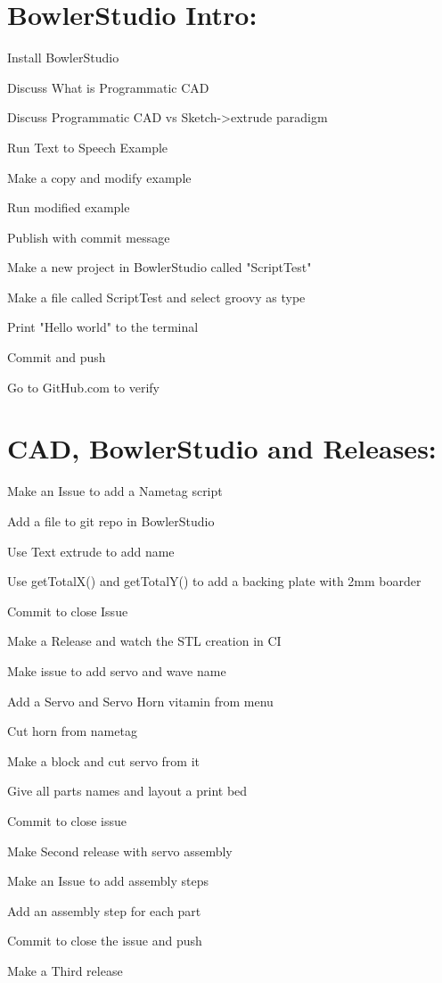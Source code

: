 \documentclass{article}
\begin{document}
\section{BowlerStudio Intro:}
\begin{todolist}
	\item Install BowlerStudio
	\item Discuss What is Programmatic CAD
	\item Discuss Programmatic CAD vs Sketch->extrude paradigm
	\item Run Text to Speech Example
	\item Make a copy and modify example
	\item Run modified example
	\item Publish with commit message
	\item Make a new project in BowlerStudio called "ScriptTest"
	\item Make a file called ScriptTest and select groovy as type
	\item Print "Hello world" to the terminal
	\item Commit and push
	\item Go to GitHub.com to verify
\end{todolist}

\newpage

\section{CAD, BowlerStudio and Releases:}
\begin{todolist}
	\item Make an Issue to add a Nametag script
	\item Add a file to git repo in BowlerStudio
	\item Use Text extrude to add name
	\item Use getTotalX() and getTotalY() to add a backing plate with 2mm boarder
	\item Commit to close Issue
	\item Make a Release and watch the STL creation in CI
	\item Make issue to add servo and wave name
	\item Add a Servo and Servo Horn vitamin from menu
	\item Cut horn from nametag
	\item Make a block and cut servo from it
	\item Give all parts names and layout a print bed
	\item Commit to close issue
	\item Make Second release with servo assembly
	\item Make an Issue to add assembly steps
	\item Add an assembly step for each part
	\item Commit to close the issue and push
	\item Make a Third release
\end{todolist}
\newpage
\end{document}
